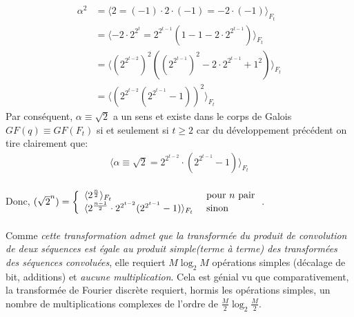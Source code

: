 \begin{align*}
\alpha^{2} &= \langle 2 = (-1)\cdot 2\cdot (-1) = -2\cdot (-1)\rangle_{F_{t}}\\
&= \langle -2\cdot 2^{2^{t}} = 2^{2^{t-1}}(1-1-2\cdot 2^{2^{t-1}})\rangle_{F_{t}}\\
&= \langle(2^{2^{t-2}})^{2}((2^{2^{t-1}})^{2}-2\cdot 2^{2^{t-1}} + 1^{2})\rangle_{F_{t}}\\
&= \langle(2^{2^{t-2}}(2^{2^{t-1}}-1))^{2}\rangle_{F_{t}}
\end{align*}
Par conséquent, $ \alpha\equiv\sqrt{2}$ a un sens et existe dans le corps de Galois $ GF(q)\equiv GF(F_{t}) $ si et seulement si $ t\geq 2 $ car du développement précédent on tire clairement que:
\begin{eqnarray}
\langle\alpha\equiv\sqrt{2} = {2^{2^{t-2}}} \cdot (2^{2^{t-1}}-1)\rangle_{F_{t}}
\end{eqnarray}
 \\
Donc, $ (\sqrt{2}^{n}) = \left\{\begin{array}{ll}
\langle 2^{\frac{n}{2}}\rangle_{F_{t}} & \mbox{ pour $ n $ pair}\\
\langle 2^{\frac{n-1}{2}}\cdot 2^{2^{t-2}}(2^{2^{t-1}}-1)\rangle_{F_{t}} & \mbox{ sinon }
\end{array}\right. $.\\
 \\
Comme \emph{cette transformation admet que la transformée du produit de convolution de deux séquences est égale au produit simple(terme à terme) des transformées des séquences convoluées}, elle requiert $ M\log_{2}M $ opérations simples (décalage de bit, additions) et \emph{aucune multiplication}. Cela est génial vu que comparativement, la transformée de Fourier discrète requiert, hormis les opérations simples, un nombre de multiplications complexes de l'ordre de $ \frac{M}{2}\log_{2}\frac{M}{2} $.
